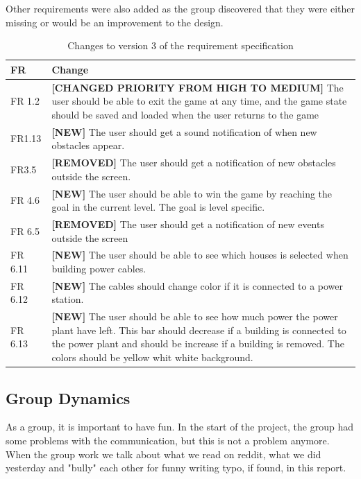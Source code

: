 	Other requirements were also added as the group discovered that they were either missing or would be an improvement to the design.
	
	\begin{table}
	\begin{tabular}{| p{1.5cm} | p{12cm} |}
		\hline
		\rowcolor{lightgray}
		{\bf FR} & {\bf Change} \\ \hline
		FR 1.2 & {\bf \color{orange}[CHANGED PRIORITY FROM HIGH TO MEDIUM]} The user should be able 
		to exit the game at any time, and the game state should be saved and loaded when the user 
		returns to the game \\ \hline
		FR1.13 & {\bf \color{green}[NEW]} The user should get a sound notification of when new obstacles appear. \\ \hline
		FR3.5 & {\bf \color{red}[REMOVED]}  The user should get a notification of new obstacles outside the screen. \\ \hline
		FR 4.6 & {\bf \color{green}[NEW]} The user should be able to win the game by reaching the goal in the current level. The goal is level specific. \\ \hline
		FR 6.5 & {\bf \color{red}[REMOVED]} The user should get a notification of new events outside 
		the screen \\ \hline
		FR 6.11 & {\bf \color{green}[NEW]} The user should be able to see which houses is selected when building power cables. \\ \hline
		FR 6.12 & {\bf \color{green}[NEW]} The cables should change color if it is connected to a power 
		station. \\ \hline
		FR 6.13 & {\bf \color{green}[NEW]} The user should be able to see how much power the 
		power plant have left. This bar should decrease if a building is connected to the power plant 
		and should be increase if a building is removed. The colors should be yellow whit white 
		background. \\ \hline
	\end{tabular}
	\caption{Changes to version 3 of the requirement specification}
	\end{table}

\subsection{Group Dynamics}
	As a group, it is important to have fun. In the start of the project, the group had some
	problems with the communication, but this is not a problem anymore.
	When the group work we talk about what we read on reddit, what we did yesterday and 
	"bully" each other for funny writing typo, if found, in this report. 


